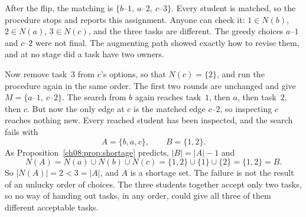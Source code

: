 \begin{center}
\end{center}

After the flip, the matching is $\{b\text{--}1,\ a\text{--}2,\ c\text{--}3\}$. Every student is matched, so the procedure stops and reports this assignment. Anyone can check it: $1\in N(b)$, $2\in N(a)$, $3\in N(c)$, and the three tasks are different. The greedy choices $a$--$1$ and $c$--$2$ were not final. The augmenting path showed exactly how to revise them, and at no stage did a task have two owners.

Now remove task~$3$ from $c$'s options, so that $N(c)=\{2\}$, and run the procedure again in the same order. The first two rounds are unchanged and give $M=\{a\text{--}1,\ c\text{--}2\}$. The search from $b$ again reaches task~$1$, then $a$, then task~$2$, then $c$. But now the only edge at $c$ is the matched edge $c$--$2$, so inspecting $c$ reaches nothing new. Every reached student has been inspected, and the search fails with
\[
A=\{b,a,c\},\qquad B=\{1,2\}.
\]
As Proposition~\ref{ch08:prop:shortage} predicts, $|B|=|A|-1$ and
\[
N(A)=N(a)\cup N(b)\cup N(c)=\{1,2\}\cup\{1\}\cup\{2\}=\{1,2\}=B.
\]
So $|N(A)|=2<3=|A|$, and $A$ is a shortage set. The failure is not the result of an unlucky order of choices. The three students together accept only two tasks, so no way of handing out tasks, in any order, could give all three of them different acceptable tasks.
